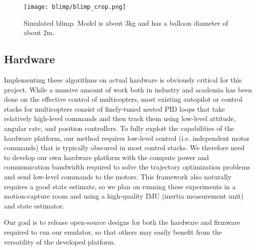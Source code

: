 \documentclass[../root.tex]{subfiles}
\begin{document}
\begin{figure}
    \centering
    \texttt{[image: blimp/blimp\_crop.png]}
    \caption{Simulated blimp. Model is about 3kg and has a
    balloon diameter of about 2m.}
    \label{fig:blimp_sim}
\end{figure}


\subsection{Hardware} \label{sec:quad_hardware}
Implementing these algorithms on actual hardware is obviously critical 
for this project. While a massive amount of work both in industry and 
academia has been done on the effective control of multicopters, most
existing autopilot or control stacks for multicopters consist of 
finely-tuned nested PID loops that take relatively high-level commands 
and then track them using low-level attitude, angular rate, and position 
controllers. To fully exploit the capabilities of the hardware platform, 
our method requires low-level control (i.e. independent motor commands) 
that is typically obscured in most control stacks. We therefore need to 
develop our own hardware platform with the compute power and communication
bandwidth required to solve the trajectory optimization problems and 
send low-level commands to the motors. This framework also naturally 
requires a good state estimate, so we plan on running these experiments 
in a motion-capture room and using a high-quality IMU 
(inertia measurement unit) and state estimator. 

Our goal is to release open-source designs for both the hardware and 
firmware required to run our emulator, so that others may easily benefit
from the versatility of the developed platform. 
\end{document}
